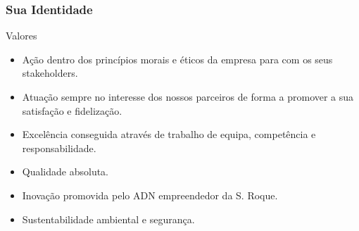 \begin{frame}
\frametitle{Sua Identidade}
\begin{exampleblock}{Valores}
\begin{itemize}
\setlength\itemsep{-0.3em}
\item Ação dentro dos princípios morais e éticos da empresa para com os seus stakeholders.
\item Atuação sempre no interesse dos nossos parceiros de forma a promover a sua satisfação e fidelização.
\item Excelência conseguida através de trabalho de equipa, competência e responsabilidade.
\item Qualidade absoluta.
\item Inovação promovida pelo ADN empreendedor da S. Roque.
\item Sustentabilidade ambiental e segurança.
\end{itemize}
\end{exampleblock}
\end{frame}
